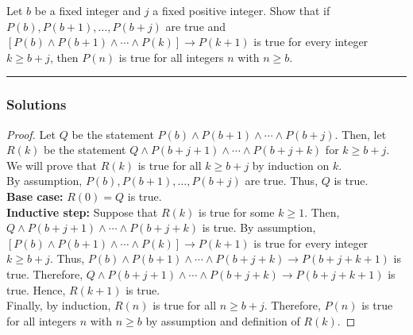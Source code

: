 \newpage
\begin{question}
Let $b$ be a fixed integer and $j$ a fixed positive integer. Show that if $P(b), P(b+1), \ldots, P(b+j)$ are true and $[P(b) \wedge P(b+1) \wedge \cdots \wedge P(k)] \rightarrow P(k+1)$ is true for every integer $k \geq b+j$, then $P(n)$ is true for all integers $n$ with $n \geq b$.
\end{question}

\par\noindent\rule{\textwidth}{0.5pt}

\subsubsection*{Solutions}

\begin{proof}
    Let $Q$ be the statement $P(b) \wedge P(b+1) \wedge \cdots \wedge P(b+j)$. Then, let $R(k)$ be the statement $Q \wedge P(b+j+1) \wedge \cdots \wedge P(b+j+k)$ for $k \geq b + j$. We will prove that $R(k)$ is true for all $k \geq b+j$ by induction on $k$. \\
    By assumption, $P(b), P(b+1), \ldots, P(b+j)$ are true. Thus, $Q$ is true.\\
    \textbf{Base case: } $R(0) = Q$ is true.\\
    \textbf{Inductive step: } Suppose that $R(k)$ is true for some $k \geq 1$. Then, $Q \wedge P(b+j+1) \wedge \cdots \wedge P(b+j+k)$ is true. By assumption, $[P(b) \wedge P(b+1) \wedge \cdots \wedge P(k)] \rightarrow P(k+1)$ is true for every integer $k \geq b+j$. Thus, $P(b) \wedge P(b+1) \wedge \cdots \wedge P(b+j+k) \rightarrow P(b+j+k+1)$ is true. Therefore, $Q \wedge P(b+j+1) \wedge \cdots \wedge P(b+j+k) \rightarrow P(b+j+k+1)$ is true. Hence, $R(k+1)$ is true.\\
    Finally, by induction, $R(n)$ is true for all $n \geq b+j$. Therefore, $P(n)$ is true for all integers $n$ with $n \geq b$ by assumption and definition of $R(k)$.
\end{proof}